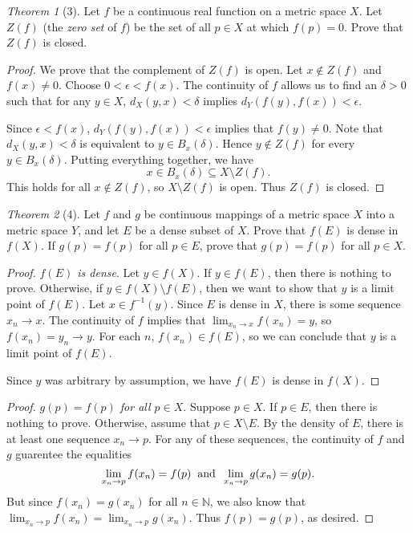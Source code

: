 \documentclass[12pt]{article}
\theoremstyle{remark}
\theoremstyle{named}
\newtheorem*{theorem}{Theorem}
\begin{document}
\begin{theorem}[3]
    Let \(f\) be a continuous real function on a metric space \(X\). Let \(Z(f)\) (the \textit{zero set} of \(f\)) be the set of all \(p \in X\) at which \(f(p) = 0\). Prove that \(Z(f)\) is closed.
\end{theorem}

\begin{proof}
    We prove that the complement of \(Z(f)\) is open. Let \(x \notin Z(f)\) and \(f(x) \neq 0\). Choose \(0 < \epsilon < f(x)\). The continuity of \(f\) allows us to find an \(\delta > 0\) such that for any \(y \in X\), \(d_X(y, x) < \delta\) implies \(d_Y(f(y), f(x)) < \epsilon\). 

    Since \(\epsilon < f(x)\), \(d_Y(f(y), f(x)) < \epsilon\) implies that \(f(y) \neq 0\). Note that \(d_X(y, x) < \delta\) is equivalent to \(y \in B_x(\delta)\). Hence \(y \notin Z(f)\) for every \(y \in B_x(\delta)\). Putting everything together, we have 
    \[x \in B_x(\delta) \subseteq X \setminus Z(f).\]
    This holds for all \(x \notin Z(f)\), so \(X \setminus Z(f)\) is open. Thus \(Z(f)\) is closed.
\end{proof}

\begin{theorem}[4]
    Let \(f\) and \(g\) be continuous mappings of a metric space \(X\) into a metric space \(Y\), and let \(E\) be a dense subset of \(X\). Prove that \(f(E)\) is dense in \(f(X)\). If \(g(p) = f(p)\) for all \(p \in E\), prove that \(g(p) = f(p)\) for all \(p \in X\). 
\end{theorem}

\begin{proof}
    \textit{\(f(E)\) is dense}. Let \(y \in f(X)\). If \(y \in f(E)\), then there is nothing to prove. Otherwise, if \(y \in f(X) \setminus f(E)\), then we want to show that \(y\) is a limit point of \(f(E)\). Let \(x \in f^{-1}(y)\). Since \(E\) is dense in \(X\), there is some sequence \(x_n \to x\). The continuity of \(f\) implies that \(\lim_{x_n \to x} f(x_n) = y\), so \(f(x_n) = y_n \to y\). For each \(n\), \(f(x_n) \in f(E)\), so we can conclude that \(y\) is a limit point of \(f(E)\). 

    Since \(y\) was arbitrary by assumption, we have \(f(E)\) is dense in \(f(X)\). 
\end{proof}

\begin{proof}
    \textit{\(g(p) = f(p)\) for all \(p \in X\)}. Suppose \(p \in X\). If \(p \in E\), then there is nothing to prove. Otherwise, assume that \(p \in X \setminus E\). By the density of \(E\), there is at least one sequence \(x_n \to p\). For any of these sequences, the continuity of \(f\) and \(g\) guarentee the equalities \[\lim_{x_n \to p} f(x_n) = f(p)\hspace{2mm} \text{and} \hspace{2mm} \lim_{x_n \to p} g(x_n) = g(p).\] 
    But since \(f(x_n) = g(x_n)\) for all \(n \in \mathbb N\), we also know that \(\lim_{x_n \to p} f(x_n) = \lim_{x_n \to p} g(x_n)\). Thus \(f(p) = g(p)\), as desired.
\end{proof}
\end{document}
